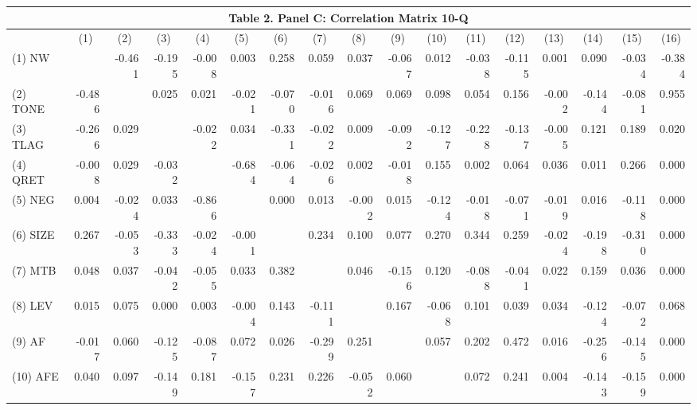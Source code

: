\begin{table}[htbp] \label{T2PC}
  \centering
    \begin{tabular}{lrrrrrrrrrrrrrrrr}
    \multicolumn{17}{c}{\textbf{Table 2. Panel C: Correlation Matrix 10-Q}} \\
    \midrule
      & \multicolumn{1}{c}{(1)} & \multicolumn{1}{c}{(2)} & \multicolumn{1}{c}{(3)} & \multicolumn{1}{c}{(4)} & \multicolumn{1}{c}{(5)} & \multicolumn{1}{c}{(6)} & \multicolumn{1}{c}{(7)} & \multicolumn{1}{c}{(8)} & \multicolumn{1}{c}{(9)} & \multicolumn{1}{c}{(10)} & \multicolumn{1}{c}{(11)} & \multicolumn{1}{c}{(12)} & \multicolumn{1}{c}{(13)} & \multicolumn{1}{c}{(14)} & \multicolumn{1}{c}{(15)} & \multicolumn{1}{c}{(16)} \\
    \midrule
    (1) NW &  & -0.461 & -0.195 & -0.008 & 0.003 & 0.258 & 0.059 & 0.037 & -0.067 & 0.012 & -0.038 & -0.115 & 0.001 & 0.090 & -0.034 & -0.384 \\
    (2) TONE & -0.486 & & 0.025 & 0.021 & -0.021 & -0.070 & -0.016 & 0.069 & 0.069 & 0.098 & 0.054 & 0.156 & -0.002 & -0.144 & -0.081 & 0.955 \\
    (3) TLAG & -0.266 & 0.029 & & -0.022 & 0.034 & -0.331 & -0.022 & 0.009 & -0.092 & -0.127 & -0.228 & -0.137 & -0.005 & 0.121 & 0.189 & 0.020 \\
    (4) QRET & -0.008 & 0.029 & -0.032 & & -0.684 & -0.064 & -0.026 & 0.002 & -0.018 & 0.155 & 0.002 & 0.064 & 0.036 & 0.011 & 0.266 & 0.000 \\
    (5) NEG & 0.004 & -0.024 & 0.033 & -0.866 & & 0.000 & 0.013 & -0.002 & 0.015 & -0.124 & -0.018 & -0.071 & -0.019 & 0.016 & -0.118 & 0.000 \\
    (6) SIZE & 0.267 & -0.053 & -0.333 & -0.024 & -0.001 &  & 0.234 & 0.100 & 0.077 & 0.270 & 0.344 & 0.259 & -0.024 & -0.198 & -0.310 & 0.000 \\
    (7) MTB & 0.048 & 0.037 & -0.042 & -0.055 & 0.033 & 0.382 & & 0.046 & -0.156 & 0.120 & -0.088 & -0.041 & 0.022 & 0.159 & 0.036 & 0.000 \\
    (8) LEV & 0.015 & 0.075 & 0.000 & 0.003 & -0.004 & 0.143 & -0.111 &  & 0.167 & -0.068 & 0.101 & 0.039 & 0.034 & -0.124 & -0.072 & 0.068 \\
    (9) AF & -0.017 & 0.060 & -0.125 & -0.087 & 0.072 & 0.026 & -0.299 & 0.251 &  & 0.057 & 0.202 & 0.472 & 0.016 & -0.256 & -0.145 & 0.000 \\
    (10) AFE & 0.040 & 0.097 & -0.149 & 0.181 & -0.157 & 0.231 & 0.226 & -0.052 & 0.060 &  & 0.072 & 0.241 & 0.004 & -0.143 & -0.159 & 0.000 \\

\end{tabular}
\end{table}
